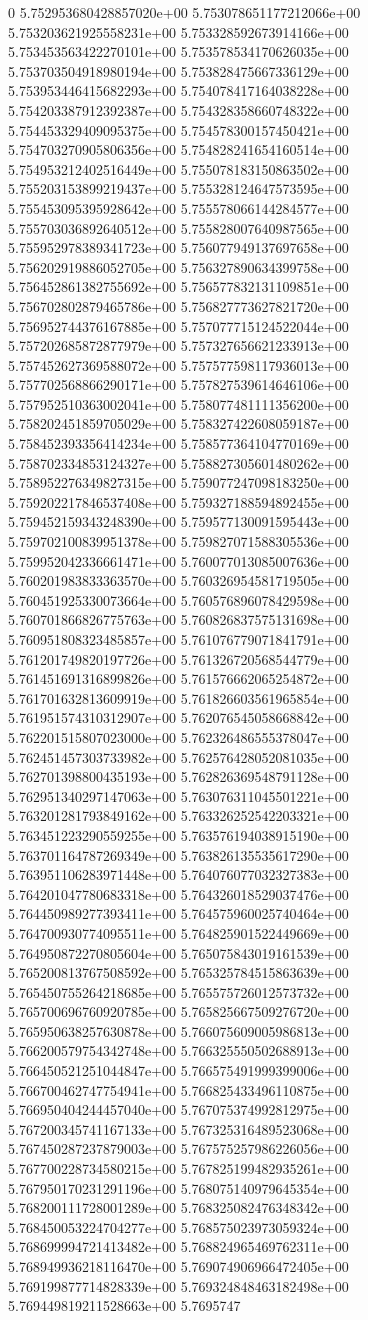 0	5.752953680428857020e+00	5.753078651177212066e+00	5.753203621925558231e+00	5.753328592673914166e+00	5.753453563422270101e+00	5.753578534170626035e+00	5.753703504918980194e+00	5.753828475667336129e+00	5.753953446415682293e+00	5.754078417164038228e+00	5.754203387912392387e+00	5.754328358660748322e+00	5.754453329409095375e+00	5.754578300157450421e+00	5.754703270905806356e+00	5.754828241654160514e+00	5.754953212402516449e+00	5.755078183150863502e+00	5.755203153899219437e+00	5.755328124647573595e+00	5.755453095395928642e+00	5.755578066144284577e+00	5.755703036892640512e+00	5.755828007640987565e+00	5.755952978389341723e+00	5.756077949137697658e+00	5.756202919886052705e+00	5.756327890634399758e+00	5.756452861382755692e+00	5.756577832131109851e+00	5.756702802879465786e+00	5.756827773627821720e+00	5.756952744376167885e+00	5.757077715124522044e+00	5.757202685872877979e+00	5.757327656621233913e+00	5.757452627369588072e+00	5.757577598117936013e+00	5.757702568866290171e+00	5.757827539614646106e+00	5.757952510363002041e+00	5.758077481111356200e+00	5.758202451859705029e+00	5.758327422608059187e+00	5.758452393356414234e+00	5.758577364104770169e+00	5.758702334853124327e+00	5.758827305601480262e+00	5.758952276349827315e+00	5.759077247098183250e+00	5.759202217846537408e+00	5.759327188594892455e+00	5.759452159343248390e+00	5.759577130091595443e+00	5.759702100839951378e+00	5.759827071588305536e+00	5.759952042336661471e+00	5.760077013085007636e+00	5.760201983833363570e+00	5.760326954581719505e+00	5.760451925330073664e+00	5.760576896078429598e+00	5.760701866826775763e+00	5.760826837575131698e+00	5.760951808323485857e+00	5.761076779071841791e+00	5.761201749820197726e+00	5.761326720568544779e+00	5.761451691316899826e+00	5.761576662065254872e+00	5.761701632813609919e+00	5.761826603561965854e+00	5.761951574310312907e+00	5.762076545058668842e+00	5.762201515807023000e+00	5.762326486555378047e+00	5.762451457303733982e+00	5.762576428052081035e+00	5.762701398800435193e+00	5.762826369548791128e+00	5.762951340297147063e+00	5.763076311045501221e+00	5.763201281793849162e+00	5.763326252542203321e+00	5.763451223290559255e+00	5.763576194038915190e+00	5.763701164787269349e+00	5.763826135535617290e+00	5.763951106283971448e+00	5.764076077032327383e+00	5.764201047780683318e+00	5.764326018529037476e+00	5.764450989277393411e+00	5.764575960025740464e+00	5.764700930774095511e+00	5.764825901522449669e+00	5.764950872270805604e+00	5.765075843019161539e+00	5.765200813767508592e+00	5.765325784515863639e+00	5.765450755264218685e+00	5.765575726012573732e+00	5.765700696760920785e+00	5.765825667509276720e+00	5.765950638257630878e+00	5.766075609005986813e+00	5.766200579754342748e+00	5.766325550502688913e+00	5.766450521251044847e+00	5.766575491999399006e+00	5.766700462747754941e+00	5.766825433496110875e+00	5.766950404244457040e+00	5.767075374992812975e+00	5.767200345741167133e+00	5.767325316489523068e+00	5.767450287237879003e+00	5.767575257986226056e+00	5.767700228734580215e+00	5.767825199482935261e+00	5.767950170231291196e+00	5.768075140979645354e+00	5.768200111728001289e+00	5.768325082476348342e+00	5.768450053224704277e+00	5.768575023973059324e+00	5.768699994721413482e+00	5.768824965469762311e+00	5.768949936218116470e+00	5.769074906966472405e+00	5.769199877714828339e+00	5.769324848463182498e+00	5.769449819211528663e+00	5.7695747